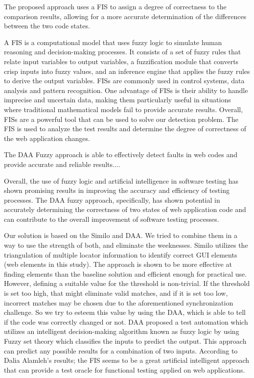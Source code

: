 \documentclass{article}
\begin{document}
The proposed approach uses a FIS to assign a degree of correctness to the comparison results, allowing for a more accurate determination of the differences between the two code states.

A FIS is a computational model that uses fuzzy logic to simulate human reasoning and decision-making processes. It consists of a set of fuzzy rules that relate input variables to output variables, a fuzzification module that converts crisp inputs into fuzzy values, and an inference engine that applies the fuzzy rules to derive the output variables. FISs are commonly used in control systems, data analysis and pattern recognition. One advantage of FISs is their ability to handle imprecise and uncertain data, making them particularly useful in situations where traditional mathematical models fail to provide accurate results. Overall, FISs are a powerful tool that can be used to solve our detection problem. The FIS is used to analyze the test results and determine the degree of correctness of the web application changes. 

The DAA Fuzzy approach is able to effectively detect faults in web codes and provide accurate and reliable results....

Overall, the use of fuzzy logic and artificial intelligence in software testing has shown promising results in improving the accuracy and efficiency of testing processes. The DAA fuzzy approach, specifically, has shown potential in accurately determining the correctness of two states of web application code and can contribute to the overall improvement of software testing processes.

Our solution is based on the Similo and DAA. We tried to combine them in a way to use the strength of both, and eliminate the weeknesses. Similo utilizes the triangulation of multiple locator information to identify correct GUI elements (web elements in this study). The approach is shown to be more effective at finding elements than the baseline solution and efficient enough for practical use. However, defining a suitable value for the threshold is non-trivial. If the threshold is set too high, that might eliminate valid matches, and if it is set too low, incorrect matches may be chosen due to the aforementioned synchronization challenge. So we try to esteem this value by using the DAA, which is able to tell if the code was correctly changed or not. DAA proposed a test automation which utilizes an intelligent decision-making algorithm known as fuzzy logic by using Fuzzy set theory which classifies the inputs to predict the output. This approach can predict any possible results for a combination of two inputs. According to Dalia Alamleh's results; the FIS seems to be a great artificial intelligent approach that can provide a test oracle for functional testing applied on web applications.
\end{document}
